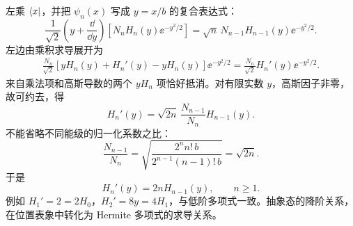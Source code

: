\begin{checkedsolution}
左乘 $\left\langle x\right|$，并把 $\psi_n(x)$ 写成 $y=x/b$ 的复合表达式：
\begin{equation}
  \frac1{\sqrt2}\left(y+\frac{\dd}{\dd y}\right)
       \left[N_nH_n(y)\ee^{-y^2/2}\right]
  =\sqrt n\,N_{n-1}H_{n-1}(y)\ee^{-y^2/2}.
\end{equation}
左边由乘积求导展开为
\begin{align}
  \frac{N_n}{\sqrt2}
    \left[yH_n(y)+H_n'(y)-yH_n(y)\right]\ee^{-y^2/2}
  =\frac{N_n}{\sqrt2}H_n'(y)\ee^{-y^2/2}.
\end{align}
来自乘法项和高斯导数的两个 $yH_n$ 项恰好抵消。对有限实数 $y$，高斯因子非零，故可约去，得
\begin{equation}
  H_n'(y)=\sqrt{2n}\,\frac{N_{n-1}}{N_n}H_{n-1}(y).
\end{equation}
不能省略不同能级的归一化系数之比：
\begin{equation}
  \frac{N_{n-1}}{N_n}
  =\sqrt{\frac{2^n n!\,b}{2^{n-1}(n-1)!\,b}}=\sqrt{2n}.
\end{equation}
于是
\begin{equation}
  \boxed{H_n'(y)=2nH_{n-1}(y),\qquad n\ge1}.
\end{equation}
例如 $H_1'=2=2H_0$，$H_2'=8y=4H_1$，与低阶多项式一致。抽象态的降阶关系，在位置表象中转化为 Hermite 多项式的求导关系。
\end{checkedsolution}
